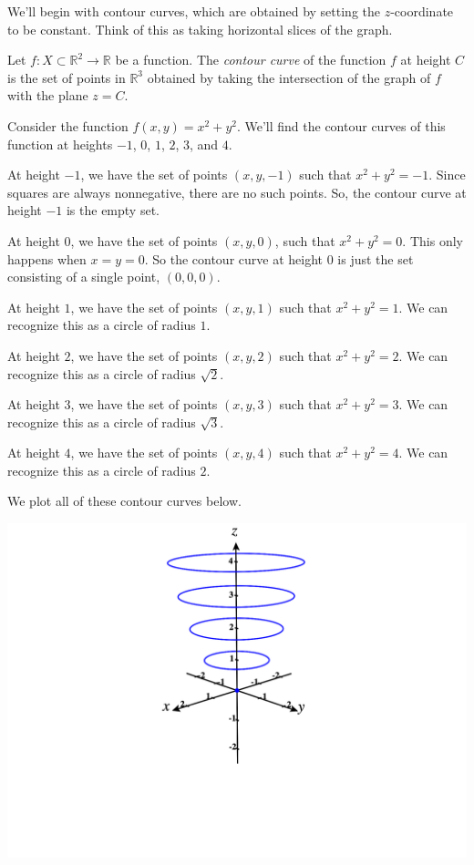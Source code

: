 \documentclass{ximera}
\begin{document}
We'll begin with contour curves, which are obtained by setting the $z$-coordinate to be constant. Think of this as taking horizontal slices of the graph.

\begin{definition}
Let $f:X\subset\mathbb{R}^2\rightarrow\mathbb{R}$ be a function. The \emph{contour curve} of the function $f$ at height $C$ is the set of points in $\mathbb{R}^3$ obtained by taking the intersection of the graph of $f$ with the plane $z=C$.
\end{definition} 

\begin{example}
Consider the function $f(x,y) = x^2+y^2$. We'll find the contour curves of this function at heights $-1$, $0$, $1$, $2$, $3$, and $4$.

At height $-1$, we have the set of points $(x,y,-1)$ such that $x^2+y^2=-1$. Since squares are always nonnegative, there are no such points. So, the contour curve at height $-1$ is the empty set.

At height $0$, we have the set of points $(x,y,0)$, such that $x^2+y^2=0$. This only happens when $x=y=0$. So the contour curve at height $0$ is just the set consisting of a single point, $(0,0,0)$.

At height $1$, we have the set of points $(x,y,1)$ such that $x^2+y^2=1$. We can recognize this as a circle of radius $1$.

At height $2$, we have the set of points $(x,y,2)$ such that $x^2+y^2=2$. We can recognize this as a circle of radius $\sqrt{2}$.

At height $3$, we have the set of points $(x,y,3)$ such that $x^2+y^2=3$. We can recognize this as a circle of radius $\sqrt{3}$.

At height $4$, we have the set of points $(x,y,4)$ such that $x^2+y^2=4$. We can recognize this as a circle of radius $2$.

We plot all of these contour curves below.

\begin{image}
\includegraphics[width = \textwidth]{CalcPlot3D-contour}
\end{image}


\end{example}
\end{document}
